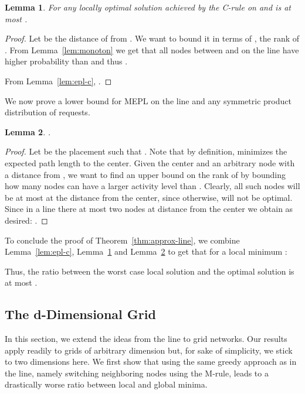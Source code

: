\documentclass[conference]{IEEEtran}
\newtheorem{lemma}{Lemma}
\begin{document}
\begin{lemma}\label{lemma:upper_bound_line}
For any locally optimal solution  achieved by the C-rule on  and  is at most .
\end{lemma}
\begin{proof}
Let  be the distance of  from . We want to bound it in terms of , the rank of .
From Lemma~\ref{lem:monoton} we get that all nodes between  and  on the line have higher probability than  and thus .

From Lemma~\ref{lem:epl-c}, .
\end{proof}
We now prove a lower bound for MEPL on the line and any symmetric product distribution of requests.
\begin{lemma}\label{lem:1-D-lower}
.
\end{lemma}
\begin{proof}
Let  be the placement  such that . Note that by definition,  minimizes the expected path length to the center. Given the center  and an arbitrary node  with a distance  from , we want to find an upper bound on the rank of  by bounding how many nodes can have a larger activity level than . Clearly, all such nodes will be at most at the distance  from the center, since otherwise,  will not be optimal.
Since in a line there at most two nodes at distance  from the center  we obtain as desired: .
\end{proof}

To conclude the proof of Theorem~\ref{thm:approx-line}, we combine Lemma~\ref{lem:epl-c}, Lemma~\ref{lemma:upper_bound_line} and Lemma~\ref{lem:1-D-lower} to get that for a local minimum :

Thus, the ratio between the worst case local solution and the optimal solution is at most .  








\subsection{The d-Dimensional Grid}

In this section, we extend the ideas from the line to grid networks. Our results apply readily to grids of arbitrary dimension but, for sake of simplicity, we stick to two dimensions here.
We first show that using the same greedy approach as in the line, namely switching neighboring nodes using the M-rule, leads to a drastically worse ratio between local and global minima.
\end{document}
